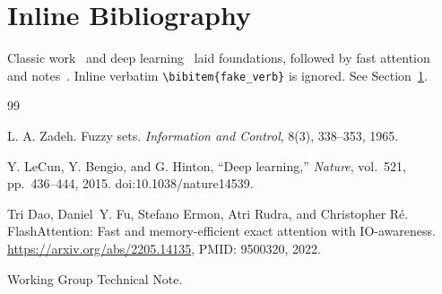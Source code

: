 \documentclass{article}
\begin{document}
\section{Inline Bibliography}\label{sec:inline}
Classic work~\cite{k_plain} and deep learning~\cite{k_opt_doi} laid foundations,
followed by fast attention~\cite{k_arxiv_pmid} and notes~\cite{k_minimal}.
Inline verbatim \verb|\bibitem{fake_verb}| is ignored.
See Section~\ref{sec:inline}.

\begin{thebibliography}{99}

L. A. Zadeh. Fuzzy sets. \emph{Information and Control}, 8(3), 338--353, 1965.

Y. LeCun, Y. Bengio, and G. Hinton, ``Deep learning,'' \emph{Nature}, vol.~521, pp.~436--444, 2015. doi:10.1038/nature14539.

Tri Dao, Daniel~Y. Fu, Stefano Ermon, Atri Rudra, and Christopher R{\'e}.
\newblock FlashAttention: Fast and memory-efficient exact attention with {IO}-awareness.
\newblock \url{https://arxiv.org/abs/2205.14135}, PMID: 9500320, 2022.

Working Group Technical Note.

\end{thebibliography}
\end{document}
